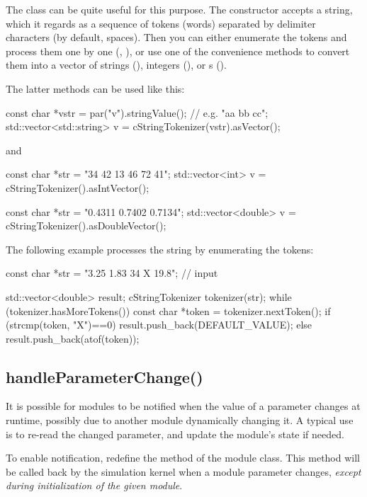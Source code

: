 The  class can be quite useful for this
purpose. The constructor accepts a string, which it regards as
a sequence of tokens (words) separated by delimiter characters
(by default, spaces). Then you can either enumerate the tokens
and process them one by one (, ),
or use one of the  convenience methods to convert
them into a vector of strings (), integers (),
or s ().

The latter methods can be used like this:

\begin{cpp}
const char *vstr = par("v").stringValue(); // e.g. "aa bb cc";
std::vector<std::string> v = cStringTokenizer(vstr).asVector();
\end{cpp}

and

\begin{cpp}
const char *str = "34 42 13 46 72 41";
std::vector<int> v = cStringTokenizer().asIntVector();

const char *str = "0.4311 0.7402 0.7134";
std::vector<double> v = cStringTokenizer().asDoubleVector();
\end{cpp}

The following example processes the string by enumerating the tokens:

\begin{cpp}
const char *str = "3.25 1.83 34 X 19.8"; // input

std::vector<double> result;
cStringTokenizer tokenizer(str);
while (tokenizer.hasMoreTokens())
{
    const char *token = tokenizer.nextToken();
    if (strcmp(token, "X")==0)
        result.push_back(DEFAULT_VALUE);
    else
        result.push_back(atof(token));
}
\end{cpp}

\subsection{handleParameterChange()}
\label{sec:simple-modules:handleParameterChange}

It is possible for modules to be notified when the value of a
parameter changes at runtime, possibly due to another module
dynamically changing it. A typical use is to re-read the changed
parameter, and update the module's state if needed.

To enable notification, redefine the  method
of the module class. This method will be called back by the
simulation kernel when a module parameter changes, \textit{except during
initialization of the given module}.

